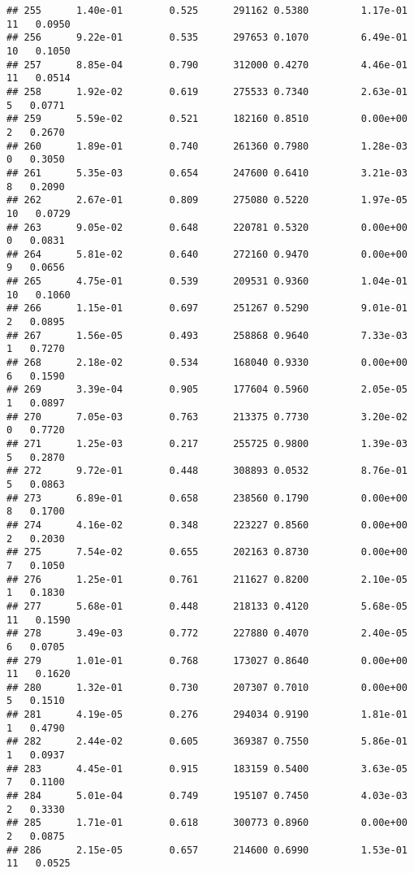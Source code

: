 \documentclass[
]{article}
\begin{document}
\begin{verbatim}
## 255      1.40e-01        0.525      291162 0.5380         1.17e-01  11   0.0950
## 256      9.22e-01        0.535      297653 0.1070         6.49e-01  10   0.1050
## 257      8.85e-04        0.790      312000 0.4270         4.46e-01  11   0.0514
## 258      1.92e-02        0.619      275533 0.7340         2.63e-01   5   0.0771
## 259      5.59e-02        0.521      182160 0.8510         0.00e+00   2   0.2670
## 260      1.89e-01        0.740      261360 0.7980         1.28e-03   0   0.3050
## 261      5.35e-03        0.654      247600 0.6410         3.21e-03   8   0.2090
## 262      2.67e-01        0.809      275080 0.5220         1.97e-05  10   0.0729
## 263      9.05e-02        0.648      220781 0.5320         0.00e+00   0   0.0831
## 264      5.81e-02        0.640      272160 0.9470         0.00e+00   9   0.0656
## 265      4.75e-01        0.539      209531 0.9360         1.04e-01  10   0.1060
## 266      1.15e-01        0.697      251267 0.5290         9.01e-01   2   0.0895
## 267      1.56e-05        0.493      258868 0.9640         7.33e-03   1   0.7270
## 268      2.18e-02        0.534      168040 0.9330         0.00e+00   6   0.1590
## 269      3.39e-04        0.905      177604 0.5960         2.05e-05   1   0.0897
## 270      7.05e-03        0.763      213375 0.7730         3.20e-02   0   0.7720
## 271      1.25e-03        0.217      255725 0.9800         1.39e-03   5   0.2870
## 272      9.72e-01        0.448      308893 0.0532         8.76e-01   5   0.0863
## 273      6.89e-01        0.658      238560 0.1790         0.00e+00   8   0.1700
## 274      4.16e-02        0.348      223227 0.8560         0.00e+00   2   0.2030
## 275      7.54e-02        0.655      202163 0.8730         0.00e+00   7   0.1050
## 276      1.25e-01        0.761      211627 0.8200         2.10e-05   1   0.1830
## 277      5.68e-01        0.448      218133 0.4120         5.68e-05  11   0.1590
## 278      3.49e-03        0.772      227880 0.4070         2.40e-05   6   0.0705
## 279      1.01e-01        0.768      173027 0.8640         0.00e+00  11   0.1620
## 280      1.32e-01        0.730      207307 0.7010         0.00e+00   5   0.1510
## 281      4.19e-05        0.276      294034 0.9190         1.81e-01   1   0.4790
## 282      2.44e-02        0.605      369387 0.7550         5.86e-01   1   0.0937
## 283      4.45e-01        0.915      183159 0.5400         3.63e-05   7   0.1100
## 284      5.01e-04        0.749      195107 0.7450         4.03e-03   2   0.3330
## 285      1.71e-01        0.618      300773 0.8960         0.00e+00   2   0.0875
## 286      2.15e-05        0.657      214600 0.6990         1.53e-01  11   0.0525

\end{verbatim}
\end{document}

